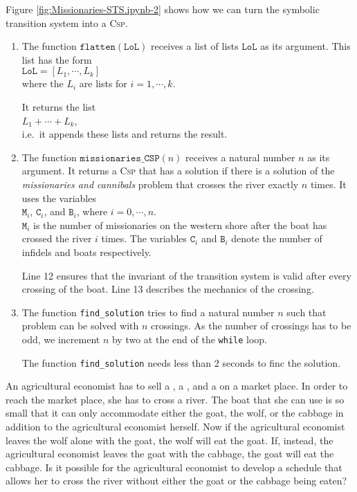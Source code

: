 Figure \ref{fig:Missionaries-STS.ipynb-2} shows how we can turn the symbolic transition system into a
\textsc{Csp}.
\begin{enumerate}
\item The function $\texttt{flatten}(\texttt{LoL})$ receives a list of lists $\texttt{LoL}$ as its argument.
       This list has the form
       \\[0.2cm]
       \hspace*{1.3cm}
       $\texttt{LoL} = [L_1, \cdots, L_k]$
       \\[0.2cm]
       where the $L_i$ are lists for $i=1,\cdots,k$.
       
       It returns the list
       \\[0.2cm]
       \hspace*{1.3cm}
       $L_1 + \cdots + L_k$,
       \\[0.2cm]
       i.e.~it appends these lists and returns the result.
\item The function $\mathtt{missionaries\_CSP}(n)$ receives a natural number $n$ as its argument.
       It returns a \textsc{Csp} that has a solution if there is a solution of the \emph{missionaries and cannibals}
       problem that crosses the river exactly $n$ times.  It uses the variables
       \\[0.2cm]
       \hspace*{1.3cm}
       $\mathtt{M}_i$, $\mathtt{C}_i$, and $\mathtt{B}_i$, where $i=0,\cdots,n$.
       \\[0.2cm]
       $\mathtt{M}_i$ is the number of missionaries on the western shore after the boat has crossed the river
       $i$ times. The variables $\mathtt{C}_i$ and $\texttt{B}_i$ denote the number of infidels and boats
       respectively.

       Line 12 ensures that the invariant of the transition system is valid after every crossing of the boat.
       Line 13 describes the mechanics of the crossing.
\item The function \texttt{find\_solution} tries to find a natural number $n$ such that problem can be solved
       with $n$ crossings. As the number of crossings has to be odd, we increment $n$ by
       two at the end of the \texttt{while} loop.

       The function \texttt{find\_solution} needs less than 2 seconds to finc the solution.
\end{enumerate}
\pagebreak

\exerciseEng
An agricultural economist has to sell a , a , and a 
on a market place.  In order to reach the market place, she has to cross a river.  The
boat that she can use is so small that it can only accommodate either the goat, the wolf,
or the cabbage in addition to the agricultural economist herself.  Now if the agricultural
economist leaves the wolf alone with the goat, the wolf will eat the goat.  If, instead,
the agricultural economist leaves the goat with the cabbage, the goat will eat the
cabbage.  Is it possible for the agricultural economist to develop a schedule that allows
her to cross the river without either the goat or the cabbage being eaten?

